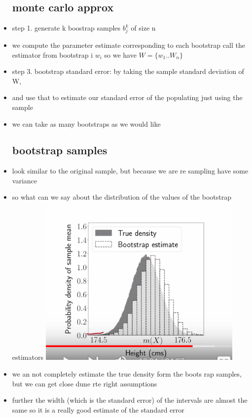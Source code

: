 \documentclass{article}
\begin{document}
\begin{itemize}
\subsection{monte carlo approx}
\item step 1. generate k boostrap samples $b_j^{k}$ of size n 
\item we compute the parameter estimate corresponding to each bootstrap  call the estimator from bootstrap i $w_i$ so we have $W=\{w_1..W_n\}$
\item step 3. bootstrap standard error: by taking the sample standard deviation of W, 
\item and use that to estimate our standard error of the populating just using the sample
\item we can take as many bootstraps as we would like 
\subsection{bootstrap samples}
\item look similar to the original sample, but because we are re sampling have some variance 
\item so what can we say about the distribution of the values of the bootstrap estimators
\includegraphics[width=10cm]{notes/week_5/video_2:the boostrap/immages/Screenshot 2023-02-25 at 23-34-20 Carlos Fernandez-Granda.png}
\item we an not completely estimate the true density form the boots rap samples, but we can get close dune rte right assumptions
\item further the width (which is the standard error) of the intervals are almost the same so it is a really good estimate of the standard error 

\end{itemize}
\end{document}
